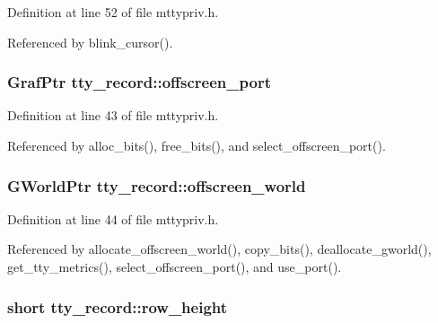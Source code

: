 Definition at line 52 of file mttypriv.\+h.



Referenced by blink\+\_\+cursor().

\hypertarget{structtty__record_ac93a01eec2960fa101e62517d59d0837}{
\subsubsection[{offscreen\+\_\+port}]{\setlength{\rightskip}{0pt plus 5cm}Graf\+Ptr tty\+\_\+record\+::offscreen\+\_\+port}}\label{structtty__record_ac93a01eec2960fa101e62517d59d0837}


Definition at line 43 of file mttypriv.\+h.



Referenced by alloc\+\_\+bits(), free\+\_\+bits(), and select\+\_\+offscreen\+\_\+port().

\hypertarget{structtty__record_ad125bdc62544af4f31425739ab2930dc}{
\subsubsection[{offscreen\+\_\+world}]{\setlength{\rightskip}{0pt plus 5cm}G\+World\+Ptr tty\+\_\+record\+::offscreen\+\_\+world}}\label{structtty__record_ad125bdc62544af4f31425739ab2930dc}


Definition at line 44 of file mttypriv.\+h.



Referenced by allocate\+\_\+offscreen\+\_\+world(), copy\+\_\+bits(), deallocate\+\_\+gworld(), get\+\_\+tty\+\_\+metrics(), select\+\_\+offscreen\+\_\+port(), and use\+\_\+port().

\hypertarget{structtty__record_ac0d2808f8a463594770388a1a61d92fc}{
\subsubsection[{row\+\_\+height}]{\setlength{\rightskip}{0pt plus 5cm}short tty\+\_\+record\+::row\+\_\+height}}\label{structtty__record_ac0d2808f8a463594770388a1a61d92fc}


